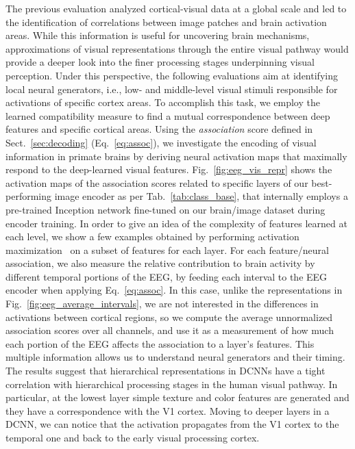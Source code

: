 \documentclass[10pt,journal,compsoc,twocolumn]{IEEEtran}
\begin{document}
The previous evaluation analyzed cortical-visual data at a global scale and led to the identification of correlations between image patches and brain activation areas. While this information is useful for uncovering brain mechanisms, approximations of visual representations through the entire visual pathway would provide a deeper look into the finer processing stages underpinning visual perception. Under this perspective, the following evaluations aim at identifying local neural generators, i.e., low- and middle-level visual stimuli responsible for activations of specific cortex areas.
To accomplish this task, we employ the learned compatibility measure to find a mutual correspondence between deep features and specific cortical areas. Using the \emph{association} score defined in Sect.~\ref{sec:decoding} (Eq.~\ref{eq:assoc}), we investigate the encoding of visual information in primate brains by deriving neural activation maps that maximally respond to the deep-learned visual features. 
Fig.~\ref{fig:eeg_vis_repr} shows the activation maps of the association scores related to specific layers of our best-performing image encoder as per Tab.~\ref{tab:class_base}, that internally employs a pre-trained Inception network fine-tuned on our brain/image dataset during encoder training. In order to give an idea of the complexity of features learned at each level, we show a few examples obtained by performing activation maximization~\cite{olah2017feature} on a subset of features for each layer. For each feature/neural association, we also measure the relative contribution to brain activity by different temporal portions of the EEG, by feeding each interval to the EEG encoder when applying Eq.~\ref{eq:assoc}. In this case, unlike the representations in Fig.~\ref{fig:eeg_average_intervals}, we are not interested in the differences in activations between cortical regions, so we compute the average unnormalized association scores over all channels, and use it as a measurement of how much each portion of the EEG affects the association to a layer's features. %
This multiple information allows us to understand neural generators and their timing. 
The results suggest that hierarchical representations in DCNNs have a tight correlation with hierarchical processing stages in the human visual pathway. In particular, at the lowest layer simple texture and color features are generated and they have a correspondence with the V1 cortex. Moving to deeper layers in a DCNN, we can notice that the activation propagates from the V1 cortex to the temporal one and back to the early visual processing cortex.
\end{document}
